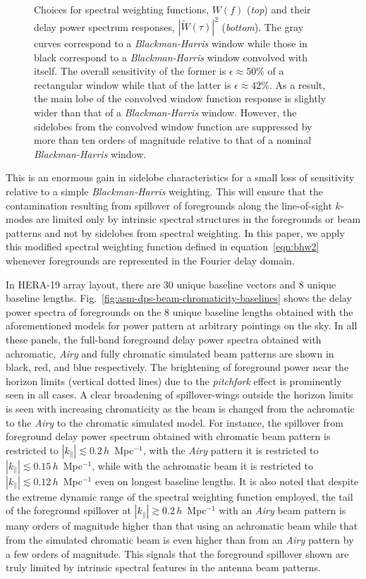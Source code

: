 \documentclass[preprint2,iop,numberedappendix,twocolappendix,appendixfloats]{emulateapj}
\begin{document}
\begin{figure}[htb]
  \caption{Choices for spectral weighting functions, $W(f)$ ({\it top}) and their delay power spectrum responses, $|\widetilde{W}(\tau)|^2$ ({\it bottom}). The gray curves correspond to a {\it Blackman-Harris} window while those in black correspond to a {\it Blackman-Harris} window convolved with itself. The overall sensitivity of the former is $\epsilon \approx 50\%$ of a rectangular window while that of the latter is $\epsilon \approx 42\%$. As a result, the main lobe of the convolved window function response is slightly wider than that of a {\it Blackman-Harris} window. However, the sidelobes from the convolved window function are suppressed by more than ten orders of magnitude relative to that of a nominal {\it Blackman-Harris} window.}
  \label{fig:window-functions}
\end{figure}

This is an enormous gain in sidelobe characteristics for a small loss of sensitivity relative to a simple {\it Blackman-Harris} weighting. This will ensure that the contamination resulting from spillover of foregrounds along the line-of-sight $k$-modes are limited only by intrinsic spectral structures in the foregrounds or beam patterns and not by sidelobes from spectral weighting. In this paper, we apply this modified spectral weighting function defined in equation~\ref{eqn:bhw2} whenever foregrounds are represented in the Fourier delay domain. 

In HERA-19 array layout, there are 30 unique baseline vectors and 8 unique baseline lengths. Fig.~\ref{fig:asm-dps-beam-chromaticity-baselines} shows the delay power spectra of foregrounds on the 8 unique baseline lengths obtained with the aforementioned models for power pattern at arbitrary pointings on the sky. In all these panels, the full-band foreground delay power spectra obtained with achromatic, {\it Airy} and fully chromatic simulated beam patterns are shown in black, red, and blue respectively. The brightening of foreground power near the horizon limits (vertical dotted lines) due to the {\it pitchfork} effect \citep{thy15a,thy15b} is prominently seen in all cases. A clear broadening of spillover-wings outside the horizon limits is seen with increasing chromaticity as the beam is changed from the achromatic to the {\it Airy} to the chromatic simulated model. For instance, the spillover from foreground delay power spectrum obtained with chromatic beam pattern is restricted to $|k_\parallel| \lesssim 0.2\,h$~Mpc$^{-1}$, with the {\it Airy} pattern it is restricted to $|k_\parallel| \lesssim 0.15\,h$~Mpc$^{-1}$, while with the achromatic beam it is restricted to $|k_\parallel| \lesssim 0.12\,h$~Mpc$^{-1}$ even on longest baseline lengths. It is also noted that despite the extreme dynamic range of the spectral weighting function employed, the tail of the foreground spillover at $|k_\parallel| \gtrsim 0.2\,h$~Mpc$^{-1}$ with an {\it Airy} beam pattern is many orders of magnitude higher than that using an achromatic beam while that from the simulated chromatic beam is even higher than from an {\it Airy} pattern by a few orders of magnitude. This signals that the foreground spillover shown are truly limited by intrinsic spectral features in the antenna beam patterns. 
\end{document}
